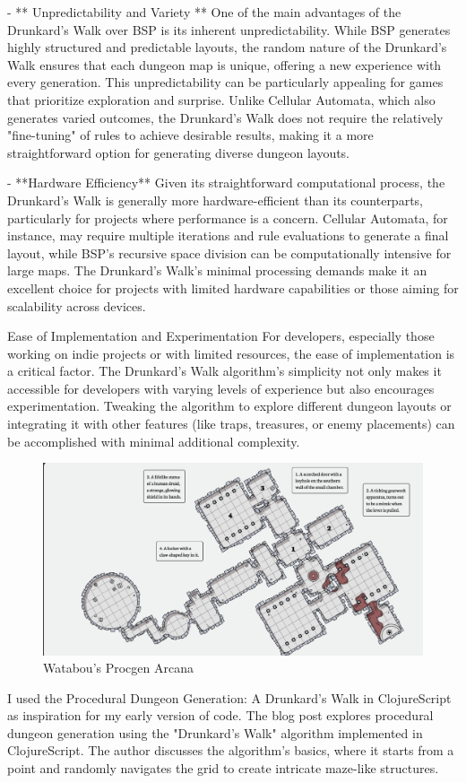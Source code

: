 \documentclass[10pt,twocolumn]{article}
\begin{document}
- ** Unpredictability and Variety **
One of the main advantages of the Drunkard's Walk over BSP is its inherent unpredictability. While BSP generates highly structured and predictable layouts, the random nature of the Drunkard's Walk ensures that each dungeon map is unique, offering a new experience with every generation. This unpredictability can be particularly appealing for games that prioritize exploration and surprise. Unlike Cellular Automata, which also generates varied outcomes, the Drunkard's Walk does not require the relatively "fine-tuning" of rules to achieve desirable results, making it a more straightforward option for generating diverse dungeon layouts.


- **Hardware Efficiency**
Given its straightforward computational process, the Drunkard's Walk is generally more hardware-efficient than its counterparts, particularly for projects where performance is a concern. Cellular Automata, for instance, may require multiple iterations and rule evaluations to generate a final layout, while BSP's recursive space division can be computationally intensive for large maps. The Drunkard's Walk's minimal processing demands make it an excellent choice for projects with limited hardware capabilities or those aiming for scalability across devices.

Ease of Implementation and Experimentation
For developers, especially those working on indie projects or with limited resources, the ease of implementation is a critical factor. The Drunkard's Walk algorithm's simplicity not only makes it accessible for developers with varying levels of experience but also encourages experimentation. Tweaking the algorithm to explore different dungeon layouts or integrating it with other features (like traps, treasures, or enemy placements) can be accomplished with minimal additional complexity.

\begin{figure}
    \centering
    \includegraphics[width=0.5\linewidth]{watab.png}
    \caption{Watabou's Procgen Arcana}
    \label{fig:enter-label}
\end{figure}

I used the Procedural Dungeon Generation: A Drunkard's Walk in ClojureScript as inspiration for my early version of code. The blog post explores procedural dungeon generation using the "Drunkard's Walk" algorithm implemented in ClojureScript. The author discusses the algorithm's basics, where it starts from a point and randomly navigates the grid to create intricate maze-like structures. \cite{jrheard_dungeon_clojurescript}
\end{document}
